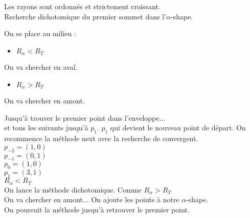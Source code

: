 \documentclass{beamer}
\begin{document}
\begin{frame}
\begin{columns}[t]
\begin{column}{3cm}
\begin{block}{}
{        }
        {
          Les rayons sont ordonnés et strictement croissant.\\
          Recherche dichotomique du premier sommet dans l'$\alpha$-shape.\\
        }        
        {
          On se place au milieu :
          \begin{itemize}
            \item $R_{\alpha} < R_T$
          \end{itemize}
          On va chercher en aval.
        }
        {
          \begin{itemize}
            \item $R_{\alpha} > R_T$
          \end{itemize}
          On va chercher en amont.
        }
        {
          Jusqu'à trouver le premier point dans l'enveloppe...\\          
        }
        {
          et tous les suivants jusqu'à $p_1$.     
        }
        {
          $p_1$ qui devient le nouveau point de départ.
        }
        {
          On recommence la méthode next avec la recherche de convergent.\\
          $p_{-2} = (1, 0)$\\
          $p_{-1} = (0, 1)$\\
          $p_{0} = (1, 0)$\\
          $p_{1} = (3, 1)$\\
        }
        {
          $R_{\alpha} < R_T$\\
          On lance la méthode dichotomique.
        }
        {
          Comme $R_{\alpha} > R_T$\\
          On va chercher en amont...
        }
        {
          On ajoute les points à notre $\alpha$-shape.\\
        }
        {
          On poursuit la méthode jusqu'à retrouver le premier point.
        }  
      \end{block}
     
    \end{column}
  \end{columns}

\end{frame}
\end{document}
